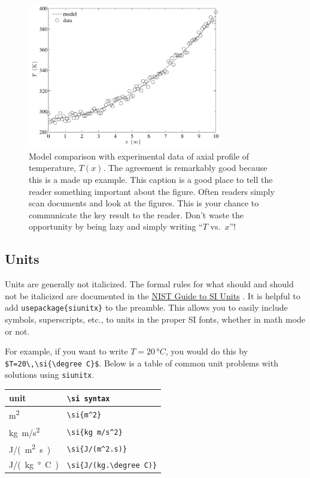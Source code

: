 \documentclass[12pt,letterpaper]{article}
\begin{document}
\begin{figure}
\centering
\includegraphics[width=0.75\textwidth]{example.pdf}
\caption{Model comparison with experimental data of axial profile of temperature, $T(x)$.  The agreement is remarkably good because this is a made up example.  This caption is a good place to tell the reader something important about the figure.  Often readers simply scan documents and look at the figures.  This is your chance to communicate the key result to the reader.  Don't waste the opportunity by being lazy and simply writing ``$T$ vs.~$x$''!}
\label{fig:example}
\end{figure}

\subsection{Units}

Units are generally not italicized.  The formal rules for what should and should not be italicized are documented in the \href{http://www.nist.gov/pml/pubs/sp811/index.cfm}{NIST Guide to SI Units} \cite{Thompson:2008}.  It is helpful to add \verb/usepackage{siunitx}/ to the preamble.  This allows you to easily include symbols, superscripts, etc., to units in the proper SI fonts, whether in math mode or not.

For example, if you want to write $T=20\,\si{\degree C}$, you would do this by \verb/$T=20\,\si{\degree C}$/. Below is a table of common unit problems with solutions using \verb/siunitx/.

\begin{center}
\begin{tabular}{ll}
unit & \verb/\si syntax/ \\
\hline
\si{m^2} & \verb/\si{m^2}/ \\
\si{kg m/s^2} & \verb=\si{kg m/s^2}= \\
\si{J/(m^2.s)} & \verb=\si{J/(m^2.s)}= \\
\si{J/(kg.\degree C)} & \verb=\si{J/(kg.\degree C)}=
\end{tabular}
\end{center}
\end{document}
